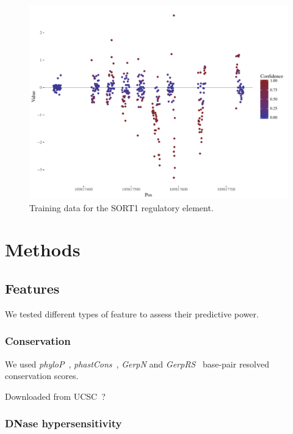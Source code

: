\documentclass{article}
\begin{document}
\begin{figure}
\includegraphics[width=\textwidth]{fig-value-conf-SORT1}
\caption{Training data for the SORT1 regulatory element.}
\label{fig:training-sort1}
\end{figure}



\section*{Methods}


\subsection*{Features}

We tested different types of feature to assess their predictive power.


\subsubsection*{Conservation}

We used \emph{phyloP}~\cite{PollardDetectionnonneutralsubstitution2010},
\emph{phastCons}~\cite{SiepelEvolutionarilyconservedelements2005}, \emph{GerpN}
and \emph{GerpRS}~\cite{CooperDistributionintensityconstraint2005a} base-pair
resolved conservation scores.

Downloaded from UCSC~\cite{KuhnUCSCgenomebrowser2013}?


\subsubsection*{DNase hypersensitivity}
\end{document}
